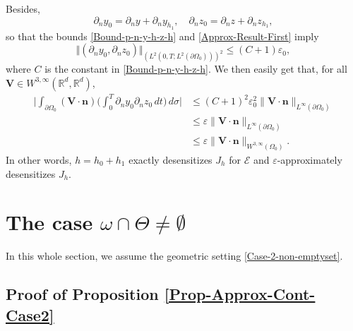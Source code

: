 \documentclass[JEP,XML,SOM,Unicode,NoFloatCountersInSection]{cedram}
\newcommand{\bn}{\boldsymbol{n}}
\newcommand{\bV}{\boldsymbol{V}}
\newcommand\R{{\mathbb R}}
\newcommand{\norm}[1]{\Vert#1\Vert}
\theoremstyle{definition}
\begin{document}
Besides,
\[
\partial_n y_0 = \partial_n y + \partial_n y_{h_1}, \quad \partial_n z_0 = \partial_n z + \partial_n z_{h_1},
\]
so that the bounds \eqref{Bound-p-n-y-h-z-h} and \eqref{Approx-Result-First} imply
\[
\norm{(\partial_n y_0, \partial_n z_0)}_{(L^2(0,T; L^2(\partial \Omega_0)))^2}
\leq
(C+1) \varepsilon_0,
\]
where $C$ is the constant in \eqref{Bound-p-n-y-h-z-h}. We then easily get that, for all $\bV \in W^{3, \infty}(\R^d, \R^d)$,
\begin{align*}
\biggl| \int_{\partial\Omega_{0}}(\bV\cdot \bn)
\biggl(\int_{0}^{T}\partial_{n}y_{0}\partial_{n} z_{0}\, dt \biggr)\,
d\sigma
\biggr|
&\leq (C+1)^2 \varepsilon_0^2 \| \bV\cdot \bn\|_{L^\infty(\partial \Omega_0)}
\\
& \leq \varepsilon \| \bV\cdot \bn\|_{L^\infty(\partial \Omega_0)}\\
& \leq \varepsilon \| \bV\cdot \bn\|_{W^{3,\infty}(\Omega_0)}.
\end{align*}
In other words, $h = h_0 + h_1$ exactly desensitizes $J_h$ for $\mathcal{E}$ and $\varepsilon$-approximately desensitizes $J_h$.

\section{The case \texorpdfstring{$\omega \cap \Theta \neq \emptyset$}{omT}}
\label{Sec-Omega-Theta-Not-Empty}

In this whole section, we assume the geometric setting \eqref{Case-2-non-emptyset}.

\subsection{Proof of Proposition \ref{Prop-Approx-Cont-Case2}}\label{Subsec-Proof-ApproxCont-Case2}
\end{document}
